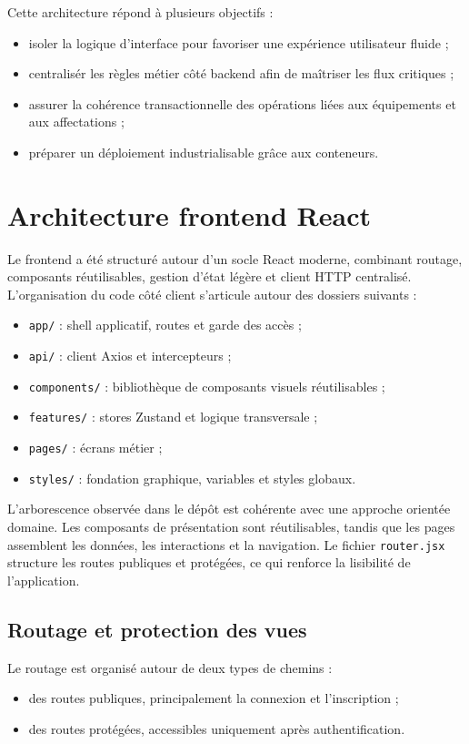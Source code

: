 ﻿\documentclass[12pt,a4paper,oneside]{report}
\begin{document}
Cette architecture répond à plusieurs objectifs :
\begin{itemize}
  \item isoler la logique d'interface pour favoriser une expérience utilisateur fluide ;
  \item centralisér les règles métier côté backend afin de maîtriser les flux critiques ;
  \item assurer la cohérence transactionnelle des opérations liées aux équipements et aux affectations ;
  \item préparer un déploiement industrialisable grâce aux conteneurs.
\end{itemize}

\section{Architecture frontend React}
Le frontend a été structuré autour d'un socle React moderne, combinant routage, composants réutilisables, gestion d'état légère et client HTTP centralisé. L'organisation du code côté client s'articule autour des dossiers suivants :

\begin{keybox}
\begin{itemize}
  \item \texttt{app/} : shell applicatif, routes et garde des accès ;
  \item \texttt{api/} : client Axios et intercepteurs ;
  \item \texttt{components/} : bibliothèque de composants visuels réutilisables ;
  \item \texttt{features/} : stores Zustand et logique transversale ;
  \item \texttt{pages/} : écrans métier ;
  \item \texttt{styles/} : fondation graphique, variables et styles globaux.
\end{itemize}
\end{keybox}

L'arborescence observée dans le dépôt est cohérente avec une approche orientée domaine. Les composants de présentation sont réutilisables, tandis que les pages assemblent les données, les interactions et la navigation. Le fichier \texttt{router.jsx} structure les routes publiques et protégées, ce qui renforce la lisibilité de l'application.

\subsection{Routage et protection des vues}
Le routage est organisé autour de deux types de chemins :
\begin{itemize}
  \item des routes publiques, principalement la connexion et l'inscription ;
  \item des routes protégées, accessibles uniquement après authentification.
\end{itemize}
\end{document}

